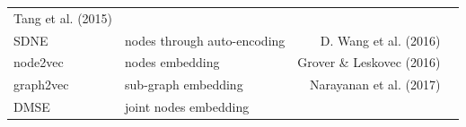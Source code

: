 \documentclass[11pt]{article}
\begin{document}
\begin{longtable}[]{@{}llrr@{}}
\begin{minipage}[t]{0.16\columnwidth}
Tang et al. (2015)\strut
\end{minipage} & \begin{minipage}[t]{0.32\columnwidth}\raggedleft
\strut
\end{minipage}\tabularnewline
\begin{minipage}[t]{0.11\columnwidth}\raggedright
SDNE\strut
\end{minipage} & \begin{minipage}[t]{0.30\columnwidth}\raggedright
nodes through auto-encoding\strut
\end{minipage} & \begin{minipage}[t]{0.16\columnwidth}\raggedleft
D. Wang et al. (2016)\strut
\end{minipage} & \begin{minipage}[t]{0.32\columnwidth}\raggedleft
\strut
\end{minipage}\tabularnewline
\begin{minipage}[t]{0.11\columnwidth}\raggedright
node2vec\strut
\end{minipage} & \begin{minipage}[t]{0.30\columnwidth}\raggedright
nodes embedding\strut
\end{minipage} & \begin{minipage}[t]{0.16\columnwidth}\raggedleft
Grover \& Leskovec (2016)\strut
\end{minipage} & \begin{minipage}[t]{0.32\columnwidth}\raggedleft
\strut
\end{minipage}\tabularnewline
\begin{minipage}[t]{0.11\columnwidth}\raggedright
graph2vec\strut
\end{minipage} & \begin{minipage}[t]{0.30\columnwidth}\raggedright
sub-graph embedding\strut
\end{minipage} & \begin{minipage}[t]{0.16\columnwidth}\raggedleft
Narayanan et al. (2017)\strut
\end{minipage} & \begin{minipage}[t]{0.32\columnwidth}\raggedleft
\strut
\end{minipage}\tabularnewline
\begin{minipage}[t]{0.11\columnwidth}\raggedright
DMSE\strut
\end{minipage} & \begin{minipage}[t]{0.30\columnwidth}\raggedright
joint nodes embedding\strut
\end{minipage} & \begin{minipage}[t]{0.16\columnwidth}\raggedleft

\end{minipage}
\end{longtable}
\end{document}
